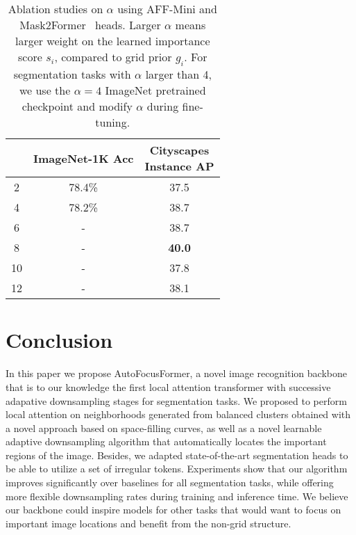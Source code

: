 \documentclass[10pt,twocolumn,letterpaper]{article}
\begin{document}
\begin{table}[htb]
\begin{center}
\begin{footnotesize}
\begin{tabular}{c|cc}
\makecell{$\alpha$} & ImageNet-1K Acc &\makecell{Cityscapes\\Instance AP}
\\\hline
2 & 78.4\% & 37.5 \\
4 & 78.2\% & 38.7 \\
6 & - & 38.7 \\
8 & - & \textbf{40.0} \\
10 & - & 37.8 \\
12 & - & 38.1 \\
\hline
\end{tabular}
\end{footnotesize}
\end{center}
\vspace{-0.6cm}
\caption{Ablation studies on $\alpha$ using AFF-Mini and Mask2Former~\cite{mask2} heads. Larger $\alpha$ means larger weight on the learned importance score $s_i$,  compared to grid prior $g_i$. For segmentation tasks with $\alpha$ larger than 4, we use the $\alpha=4$ ImageNet pretrained checkpoint and modify $\alpha$ during fine-tuning. }
\label{tb:alpha}
\vskip -0.15in
\end{table}



\section{Conclusion}\label{sec:conclusion}
In this paper we propose AutoFocusFormer, a novel image recognition backbone that is to our knowledge the first local attention transformer with successive adapative downsampling stages for segmentation tasks. We proposed to perform local attention on neighborhoods generated from  balanced clusters obtained with a novel approach based on space-filling curves, as well as a novel learnable adaptive downsampling algorithm that automatically locates the important regions of the image. Besides, we adapted state-of-the-art segmentation heads to be able to utilize a set of irregular tokens. Experiments show that our algorithm improves significantly over baselines for all segmentation tasks, while offering more flexible downsampling rates during training and inference time. We believe our backbone could inspire models for other tasks that would want to focus on important image locations and benefit from the non-grid structure.
\vspace{-0.25in}
\end{document}
